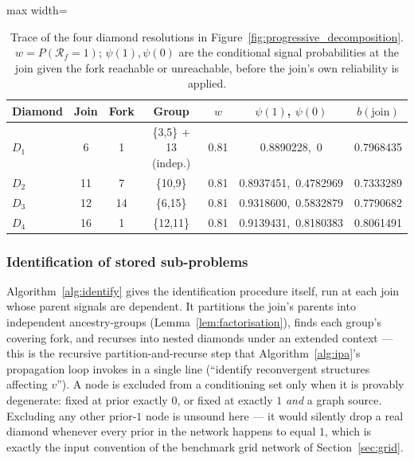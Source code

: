 \documentclass[preprint,12pt]{elsarticle}
\begin{document}
\begin{table}[ht]
\centering\small
\caption{Trace of the four diamond resolutions in Figure~\ref{fig:progressive_decomposition}. $w=P(\mathcal{R}_f{=}1)$; $\psi(1),\psi(0)$ are the conditional signal probabilities at the join given the fork reachable or unreachable, before the join's own reliability is applied.}
\label{tab:worked}
\begin{adjustbox}{max width=\linewidth}
\begin{tabular}{lcccccc}
\toprule
Diamond & Join & Fork & Group & $w$ & $\psi(1)$, $\psi(0)$ & $b(\text{join})$\\
\midrule
$D_1$ & 6  & 1 & \{3,5\} + 13 (indep.) & 0.81 & 0.8890228,\ 0 & 0.7968435\\
$D_2$ & 11 & 7 & \{10,9\}              & 0.81 & 0.8937451,\ 0.4782969 & 0.7333289\\
$D_3$ & 12 & 14 & \{6,15\}             & 0.81 & 0.9318600,\ 0.5832879 & 0.7790682\\
$D_4$ & 16 & 1 & \{12,11\}             & 0.81 & 0.9139431,\ 0.8180383 & 0.8061491\\
\bottomrule
\end{tabular}
\end{adjustbox}
\end{table}

\subsubsection{Identification of stored sub-problems}\label{sec:identification}

Algorithm~\ref{alg:identify} gives the identification procedure itself, run at each join whose parent signals are dependent. It partitions the join's parents into independent ancestry-groups (Lemma~\ref{lem:factorisation}), finds each group's covering fork, and recurses into nested diamonds under an extended context — this is the recursive partition-and-recurse step that Algorithm~\ref{alg:ipa}'s propagation loop invokes in a single line (``identify reconvergent structures affecting $v$''). A node is excluded from a conditioning set only when it is provably degenerate: fixed at prior exactly $0$, or fixed at exactly $1$ \emph{and} a graph source. Excluding any other prior-$1$ node is unsound here — it would silently drop a real diamond whenever every prior in the network happens to equal $1$, which is exactly the input convention of the benchmark grid network of Section~\ref{sec:grid}.
\end{document}
